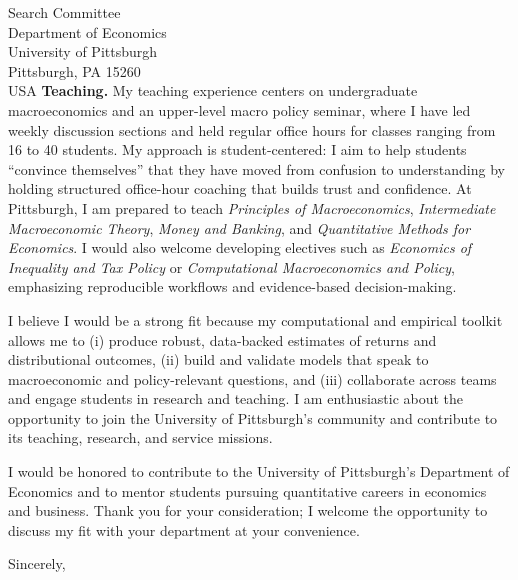 \documentclass[11pt,letterpaper]{letter}
\begin{document}
\begin{letter}{Search Committee \\
Department of Economics \\
University of Pittsburgh \\
Pittsburgh, PA 15260 \\ USA}
\textbf{Teaching.} My teaching experience centers on undergraduate macroeconomics and an upper-level macro policy seminar, where I have led weekly discussion sections and held regular office hours for classes ranging from 16 to 40 students. My approach is student-centered: I aim to help students “convince themselves” that they have moved from confusion to understanding by holding structured office-hour coaching that builds trust and confidence. At Pittsburgh, I am prepared to teach \textit{Principles of Macroeconomics}, \textit{Intermediate Macroeconomic Theory}, \textit{Money and Banking}, and \textit{Quantitative Methods for Economics}. I would also welcome developing electives such as \textit{Economics of Inequality and Tax Policy} or \textit{Computational Macroeconomics and Policy}, emphasizing reproducible workflows and evidence-based decision-making.

I believe I would be a strong fit because my computational and empirical toolkit allows me to (i) produce robust, data-backed estimates of returns and distributional outcomes, (ii) build and validate models that speak to macroeconomic and policy-relevant questions, and (iii) collaborate across teams and engage students in research and teaching. I am enthusiastic about the opportunity to join the University of Pittsburgh’s community and contribute to its teaching, research, and service missions.

I would be honored to contribute to the University of Pittsburgh’s Department of Economics and to mentor students pursuing quantitative careers in economics and business. Thank you for your consideration; I welcome the opportunity to discuss my fit with your department at your convenience.

\closing{Sincerely,}

\end{letter}
\end{document}

